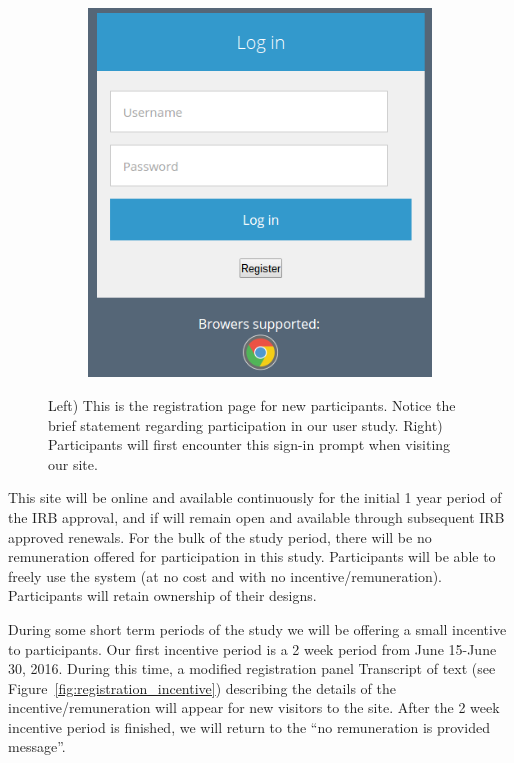 \documentclass[12pt]{article}
\begin{document}
\begin{figure}[h]
  \begin{subfigure}{.5\textwidth}
    \centering
    \includegraphics[scale=0.4]{ss_sign}
  \end{subfigure}
\caption{Left) This is the registration page for new participants. Notice the brief statement regarding participation in our user study. Right) Participants will first encounter this sign-in prompt when visiting our site.}  

\label{fig:registration}
\end{figure}


This site will be online and available continuously for the initial 1
year period of the IRB approval, and if will remain open and available
through subsequent IRB approved renewals.  For the bulk of the study
period, there will be no remuneration offered for participation in
this study. Participants will be able to freely use the system (at no
cost and with no incentive/remuneration).  Participants will retain
ownership of their designs.


During some short term periods of the study we will be offering a
small incentive to participants.  Our first incentive period is a 2
week period from June 15-June 30, 2016.  During this time, a modified
registration panel \noindent Transcript of text (see
Figure~\ref{fig:registration_incentive}) describing the details of the
incentive/remuneration will appear for new visitors to the site.
After the 2 week incentive period is finished, we will return to the
“no remuneration is provided message”.
\end{document}
